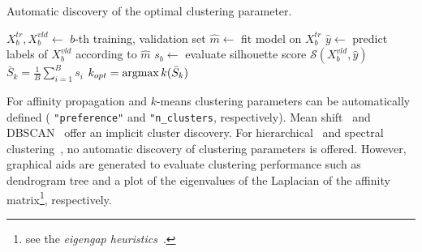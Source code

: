 \begin{algorithm}[]
  \caption{Automatic discovery of the optimal clustering parameter.}\label{alg:clusters}
    \begin{algorithmic}[1]
              \State $X^{tr}_b,X^{vld}_b\leftarrow$ $b$-th training, validation set
              \State $\hat{m}\leftarrow$ fit model on $X^{tr}_b$
              \State $\hat{y}\leftarrow$ predict labels of $X^{vld}_b$ according to $\hat{m}$
              \State $s_b\leftarrow$ evaluate silhouette score  $\mathcal{S}(X^{vld}_b,\hat{y})$
        \EndFor
        \State $\bar{S}_k = \frac{1}{B}\sum_{i=1}^B s_i$
        \EndFor
        \State $k_{opt} = \mathop{\mathrm{argmax}}\limits{k}(\bar{S}_k)$
    \end{algorithmic}
\end{algorithm}

For affinity propagation \cite{frey2007clustering} and $k$-means \cite{bishop2006pattern} clustering parameters can be automatically defined ({\color{string} {\tt "preference"}}  and {\color{string} {\tt "n\_clusters}}, respectively).
Mean shift~\cite{comaniciu2002mean} and DBSCAN~\cite{ester1996density} offer an implicit cluster discovery.
For hierarchical~\cite{hastie2009elements} and spectral clustering~\cite{shi2000normalized}, no automatic discovery of clustering parameters is offered. However, graphical aids are generated to evaluate clustering performance such as dendrogram tree and a plot of the eigenvalues of the Laplacian of the affinity matrix\footnote{see the \textit{eigengap heuristics}~\cite{von2007tutorial}.}, respectively.

